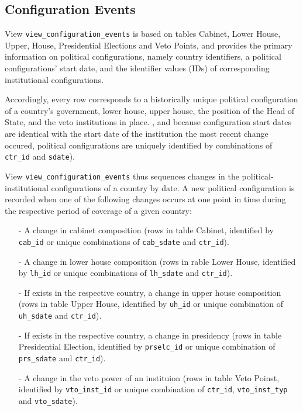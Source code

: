 \subsection{Configuration Events}\label{subsec_view_configuration_events}
View \texttt{view\_configuration\_events} is based on tables Cabinet, Lower House, Upper, House, Presidential Elections and Veto Points, and provides the primary information on political configurations, namely country identifiers, a political configurations' start date, and the identifier values (IDs) of corresponding institutional configurations.

Accordingly, every row corresponds to a historically unique political configuration of a country's government, lower house, upper house, the position of the Head of State, and the veto institutions in place. 
, and 
because configuration start dates are identical with the start date of the institution the most recent change  occured, political configurations are uniquely identified by combinations of \texttt{ctr\_id} and \texttt{sdate}).

View \texttt{view\_configuration\_events} thus sequences changes in the political-institutional configurations of a country by date.
A new political configuration is recorded when one of the following changes occurs at one point in time during the respective period of coverage of a given country:
\begin{itemize}\itemsep-4pt 
\item[-]{A change in cabinet composition (rows in table Cabinet, identified by \texttt{cab\_id} or unique combinations of \texttt{cab\_sdate} and \texttt{ctr\_id}).}
\item[-]{A change in lower house composition (rows in rable Lower House, identified by \texttt{lh\_id} or unique combinations of \texttt{lh\_sdate} and \texttt{ctr\_id}).}
\item[-]{If exists in the respective country, a change in upper house composition (rows in table Upper House, identified by \texttt{uh\_id} or unique combination of \texttt{uh\_sdate} and \texttt{ctr\_id}).}
\item[-]{If exists in the respective country, a change in presidency (rows in table Presidential Election, identified by \texttt{prselc\_id} or unique combination of \texttt{prs\_sdate} and \texttt{ctr\_id}).}
\item[-]{A change in the veto power of an instituion (rows in table Veto Poinst, identified by \texttt{vto\_inst\_id} or unique combination of \texttt{ctr\_id}, \texttt{vto\_inst\_typ} and \texttt{vto\inst\_sdate}).}
\end{itemize}


